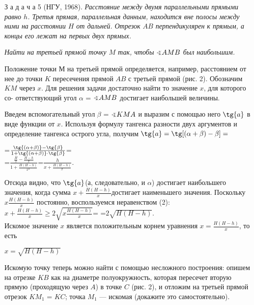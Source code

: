 \begin{multicols}{2}\fontsize{14}{14}\selectfont
	З а д а ч а 5 (НГУ, 1968). \textit{\fontsize{14}{16}Расстояние между двумя параллельными прямыми равно \(h\). Третья прямая, параллельная данным, находится вне полосы между ними на расстоянии \(H\) от дальней. Отрезок \(AB\) перпендикулярен к прямым, а концы его лежат на первых двух прямых.}
	
	\textit{\fontsize{14}{16}Найти на третьей прямой точку \(M\) так, чтобы \(\varangle AMB\) был наибольшим.}
	
	Положение точки М на третьей прямой определяется, например, расстоянием от нее до точки \(K\) пересечения прямой \(AB\) с третьей прямой (рис. 2). Обозначим \(KM\) через \(x\). Для решения задачи достаточно найти то значение \(x\), для которого со- ответствующий угол \(\alpha\) = \(\varangle AMB\) достигает наибольшей величины.
	
	Введем вспомогательный угол \(\beta\) = \(\varangle KMA\) и выразим с помощью него \(\tg{a}\) в виде функции от \(x\). Используя формулу тангенса разности двух аргументов и определение тангенса острого угла, получим \(\tg{a} = \tg[(\alpha + \beta) - \beta] =\)\begin{center}\fontsize{15}{16}
		\fontsize{15}{16}=\(\frac{\tg{(\alpha + \beta)} - \tg{\beta}}{1 + \tg{(\alpha + \beta)}\cdot\tg{\beta}}\)\fontsize{15}{16}=\\
		=\fontsize{19}{16}\(\frac{\frac{H}{x}-\frac{H - h}{x}}{1 + \frac{H(H -h)}{x^2}}\)\fontsize{15}{16}=\fontsize{19}{16}\(\frac{h}{x + \frac{H(H - h)}{x}}\).
	\end{center}
	\fontsize{14}{14}\selectfont Отсюда видно, что \(\tg{a}\)(а, следовательно, и \(\alpha\)) достигает наибольшего значения, когда сумма \(x + \frac{H(H-h)}{x}\)\columnbreak\newline достигает наименьшего значения. Поскольку \(x\frac{H(H-h)}{x}\) постоянно, воспользуемся неравенством (2):\\
	\(x + \frac{H(H-h)}{x}\geqslant2\sqrt{x\frac{H(H-h)}{x}}\)=
	=\(2\sqrt{H(H-h)}\).\\
	Искомое значение \(x\) является положительным корнем уравнения \(x=\frac{H(H-h)}{x}\), то есть
	\vspace{-0.2cm}\begin{center}
		\(x = \sqrt{H(H-h)}\)
	\end{center}
	
	Искомую точку теперь можно найти с помощью несложного построения: опишем на отрезке \(KB\) как на диаметре полуокружность, которая пересечет вторую прямую (проходящую через \(A\)) в точке \(C\) (рис. 2), и отложим на третьей прямой отрезок \(KM_1\) = \(KC\); точка \(M_1\) --- искомая (докажите это самостоятельно).
	

\end{multicols}
